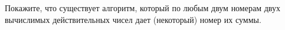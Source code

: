 Покажите, что существует алгоритм, который по любым двум номерам двух вычислимых действительных чисел
дает (некоторый) номер их суммы.
